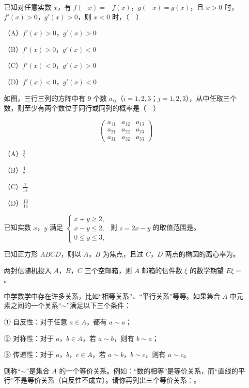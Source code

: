 \begin{question}
已知对任意实数 $x$，有 $f(-x)=-f(x)$，$g(-x)=g(x)$，且 $x>0$ 时，$f'(x)>0$，$g'(x)>0$，则 $x<0$ 时，（　）

（A）$f'(x)>0$，$g'(x)>0$

（B）$f'(x)>0$，$g'(x)<0$

（C）$f'(x)<0$，$g'(x)>0$

（D）$f'(x)<0$，$g'(x)<0$

\end{question}
\begin{question}
如图，三行三列的方阵中有 $9$ 个数 $a_{ij}$（$i=1,2,3$；$j=1,2,3$），从中任取三个数，则至少有两个数位于同行或同列的概率是（　）

\nopagebreak[4]
\[\begin{pmatrix}a_{11}&a_{12}&a_{13}\\ a_{21}&a_{22}&a_{23}\\ a_{31}&a_{32}&a_{33}\end{pmatrix}\]

（A）$\frac37$

（B）$\frac47$

（C）$\frac1{14}$

（D）$\frac{13}{14}$

\end{question}

\begin{question}
已知实数 $x$，$y$ 满足 $\begin{cases}x+y\geqslant2,\\ x-y\leqslant2,\\ 0\leqslant y\leqslant3,\end{cases}$ 则 $z=2x-y$ 的取值范围是\gkblank{}。

\end{question}
\begin{question}
已知正方形 $ABCD$，则以 $A$，$B$ 为焦点，且过 $C$，$D$ 两点的椭圆的离心率为\gkblank{}。

\end{question}
\begin{question}
两封信随机投入 $A$，$B$，$C$ 三个空邮箱，则 $A$ 邮箱的信件数 $\xi$ 的数学期望 $E\xi=$\gkblank{}。

\end{question}
\begin{question}
中学数学中存在许多关系，比如“相等关系”、“平行关系”等等。如果集合 $A$ 中元素之间的一个关系“$\sim$”满足以下三个条件：

① 自反性：对于任意 $a\in A$，都有 $a\sim a$；

② 对称性：对于 $a$，$b\in A$，若 $a\sim b$，则有 $b\sim a$；

③ 传递性：对于 $a$，$b$，$c\in A$，若 $a\sim b$，$b\sim c$，则有 $a\sim c$。

则称“$\sim$”是集合 $A$ 的一个等价关系。例如：“数的相等”是等价关系，而“直线的平行”不是等价关系（自反性不成立）。请你再列出三个等价关系：\gkblank{}。

\end{question}

